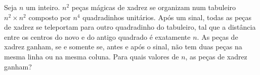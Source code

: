 Seja $n$ um inteiro. $n^2$ peças mágicas de xadrez se organizam num tabuleiro $n^2 \times n^2$ composto por $n^4$ quadradinhos unitários. Após um sinal, todas as peças de xadrez se teleportam para outro quadradinho do tabuleiro, tal que a distância entre os centros do novo e do antigo quadrado é exatamente $n$. As peças de xadrez ganham, se e somente se, antes e após o sinal, não tem duas peças na mesma linha ou na mesma coluna. Para quais valores de $n$, as peças de xadrez ganham?